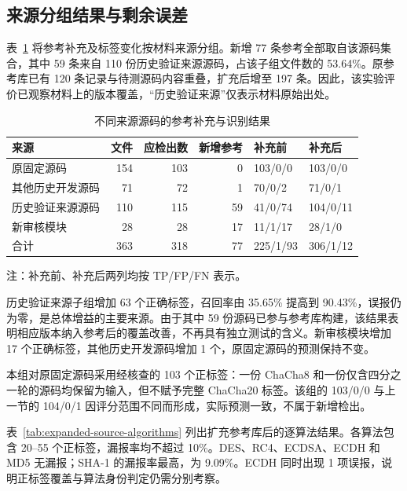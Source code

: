 \subsection{来源分组结果与剩余误差}

表~\ref{tab:expanded-source-cohorts} 将参考补充及标签变化按材料来源分组。新增 77 条参考全部取自该源码集合，其中 59 条来自 110 份历史验证来源源码，占该子组文件数的 53.64\%。原参考库已有 120 条记录与待测源码内容重叠，扩充后增至 197 条。因此，该实验评价已观察材料上的版本覆盖，“历史验证来源”仅表示材料原始出处。

\begin{table}[H]\centering\small
\caption{不同来源源码的参考补充与识别结果}
\label{tab:expanded-source-cohorts}
\begin{tabularx}{\linewidth}{@{}Xrrrll@{}}\toprule
来源 & 文件 & 应检出数 & 新增参考 & 补充前 & 补充后\\\midrule
原固定源码 & 154 & 103 & 0 & 103/0/0 & 103/0/0\\
其他历史开发源码 & 71 & 72 & 1 & 70/0/2 & 71/0/1\\
历史验证来源源码 & 110 & 115 & 59 & 41/0/74 & 104/0/11\\
新审核模块 & 28 & 28 & 17 & 11/1/17 & 28/1/0\\
合计 & 363 & 318 & 77 & 225/1/93 & 306/1/12\\\bottomrule
\end{tabularx}
\par\smallskip\raggedright\footnotesize 注：补充前、补充后两列均按 TP/FP/FN 表示。
\end{table}

历史验证来源子组增加 63 个正确标签，召回率由 35.65\% 提高到 90.43\%，误报仍为零，是总体增益的主要来源。由于其中 59 份源码已参与参考库构建，该结果表明相应版本纳入参考后的覆盖改善，不再具有独立测试的含义。新审核模块增加 17 个正确标签，其他历史开发源码增加 1 个，原固定源码的预测保持不变。

本组对原固定源码采用经核查的 103 个正标签：一份 ChaCha8 和一份仅含四分之一轮的源码均保留为输入，但不赋予完整 ChaCha20 标签。该组的 103/0/0 与上一节的 104/0/1 因评分范围不同而形成，实际预测一致，不属于新增检出。

表~\ref{tab:expanded-source-algorithms} 列出扩充参考库后的逐算法结果。各算法包含 20--55 个正标签，漏报率均不超过 10\%。DES、RC4、ECDSA、ECDH 和 MD5 无漏报；SHA-1 的漏报率最高，为 9.09\%。ECDH 同时出现 1 项误报，说明正标签覆盖与算法身份判定仍需分别考察。

